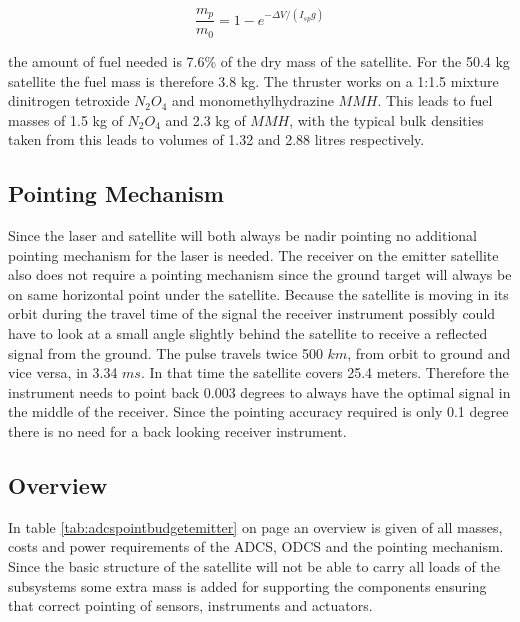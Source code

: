 \begin{equation}
\frac{m_p}{m_0} = 1 - e^{-\Delta V/(I_{sp}g)}
\label{fuelratio}
\end{equation}

the amount of fuel needed is 7.6\% of the dry mass of the satellite. For the 50.4 kg satellite the fuel mass is therefore 3.8 kg. The thruster works on a 1:1.5 mixture dinitrogen tetroxide $N_2O_4$ and monomethylhydrazine $MMH$. This leads to fuel masses of 1.5 kg of $N_2O_4$ and 2.3 kg of $MMH$, with the typical bulk densities taken from \cite{larson} this leads to volumes of 1.32 and 2.88 litres respectively.

\subsection{Pointing Mechanism}
\label{ss:emDDpoint}
Since the \acs{laser} and satellite will both always be nadir pointing no additional pointing mechanism for the \acs{laser} is needed. The receiver on the emitter satellite also does not require a pointing mechanism since the ground target will always be on same horizontal point under the satellite. Because the satellite is moving in its orbit during the travel time of the signal the receiver instrument possibly could have to look at a small angle slightly behind the satellite to receive a reflected signal from the ground. The pulse travels twice 500 $km$, from orbit to ground and vice versa, in 3.34 $ms$. In that time the satellite covers 25.4 meters. Therefore the instrument needs to point back 0.003 degrees to always have the optimal signal in the middle of the receiver. Since the pointing accuracy required is only 0.1 degree there is no need for a back looking receiver instrument.

\subsection{Overview}
\label{ss:emDDoverview}
In table \ref{tab:adcspointbudgetemitter} on page \pageref{tab:adcspointbudgetemitter} an overview is given of all masses, costs and power requirements of the \ac{ADCS}, \ac{ODCS} and the pointing mechanism. Since the basic structure of the satellite will not be able to carry all loads of the subsystems some extra mass is added for supporting the components ensuring that correct pointing of sensors, instruments and actuators.

